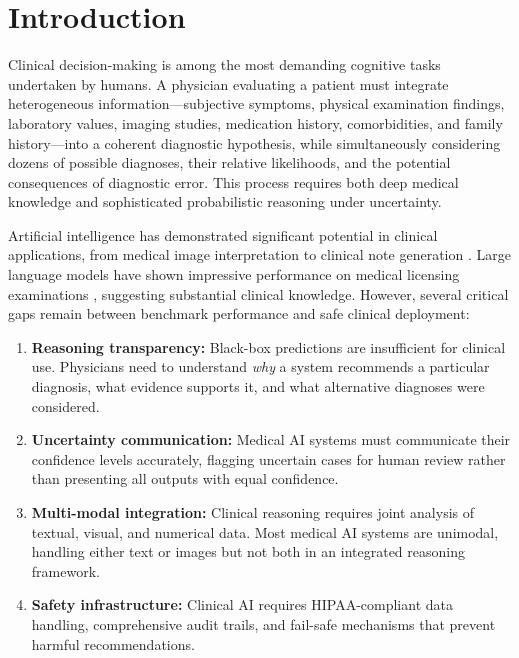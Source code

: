 \documentclass[11pt,a4paper]{article}
\begin{document}
\section{Introduction}
\label{sec:introduction}

Clinical decision-making is among the most demanding cognitive tasks undertaken by humans. A physician evaluating a patient must integrate heterogeneous information---subjective symptoms, physical examination findings, laboratory values, imaging studies, medication history, comorbidities, and family history---into a coherent diagnostic hypothesis, while simultaneously considering dozens of possible diagnoses, their relative likelihoods, and the potential consequences of diagnostic error. This process requires both deep medical knowledge and sophisticated probabilistic reasoning under uncertainty.

Artificial intelligence has demonstrated significant potential in clinical applications, from medical image interpretation \citep{rajpurkar2017chexnet,esteva2017dermatologist} to clinical note generation \citep{abacha2023overview}. Large language models have shown impressive performance on medical licensing examinations \citep{nori2023capabilities,singhal2023large}, suggesting substantial clinical knowledge. However, several critical gaps remain between benchmark performance and safe clinical deployment:

\begin{enumerate}
    \item \textbf{Reasoning transparency:} Black-box predictions are insufficient for clinical use. Physicians need to understand \textit{why} a system recommends a particular diagnosis, what evidence supports it, and what alternative diagnoses were considered.

    \item \textbf{Uncertainty communication:} Medical AI systems must communicate their confidence levels accurately, flagging uncertain cases for human review rather than presenting all outputs with equal confidence.

    \item \textbf{Multi-modal integration:} Clinical reasoning requires joint analysis of textual, visual, and numerical data. Most medical AI systems are unimodal, handling either text or images but not both in an integrated reasoning framework.

    \item \textbf{Safety infrastructure:} Clinical AI requires HIPAA-compliant data handling, comprehensive audit trails, and fail-safe mechanisms that prevent harmful recommendations.
\end{enumerate}
\end{document}
